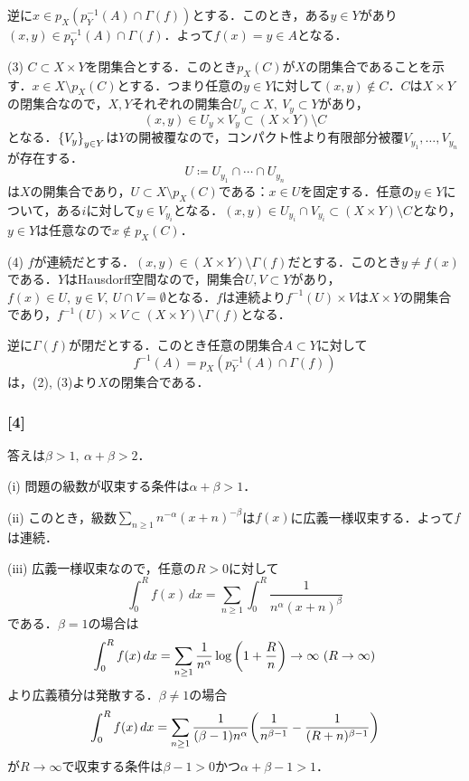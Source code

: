 \documentclass[a4j]{ltjsarticle}
\newcommand{\1}{\mathbbm{1}}
\numberwithin{equation}{section}
\theoremstyle{definition}
\begin{document}
逆に$x\in p_X(p_Y^{-1}(A)\cap \Gamma(f))$とする．このとき，ある$y\in Y$があり$(x,y)\in p_{Y}^{-1}(A)\cap \Gamma(f)$．よって$f(x)=y\in A$となる．

(3) $C\subset X\times Y$を閉集合とする．このとき$p_X(C)$が$X$の閉集合であることを示す．$x\in X\setminus p_X(C)$とする．つまり任意の$y\in Y$に対して$(x,y)\notin C$．$C$は$X\times Y$の閉集合なので，$X,Y$それぞれの開集合$U_y\subset X,\ V_y\subset Y$があり，
\begin{equation}
    (x,y)\in U_y\times V_y\subset (X\times Y)\setminus C 
\end{equation}
となる．$\qty{V_y}_{y\in Y}$は$Y$の開被覆なので，コンパクト性より有限部分被覆$V_{y_1},\ldots,V_{y_n}$が存在する．
\begin{equation}
    U\coloneq U_{y_1}\cap\cdots\cap U_{y_n} 
\end{equation}
は$X$の開集合であり，$U\subset X\setminus p_X(C)$である：$x\in U$を固定する．任意の$y\in Y$について，ある$i$に対して$y\in V_{y_i}$となる．$(x,y)\in U_{y_i}\cap V_{y_i}\subset (X\times Y)\setminus C$となり，$y\in Y$は任意なので$x\notin p_X(C)$．

(4) $f$が連続だとする．$(x,y)\in (X\times Y)\setminus \Gamma(f)$だとする．このとき$y\neq f(x)$である．$Y$はHausdorff空間なので，開集合$U,V\subset Y$があり，$f(x)\in U,\ y\in V,\ U\cap V=\emptyset$となる．$f$は連続より$f^{-1}(U)\times V$は$X\times Y$の開集合であり，$f^{-1}(U)\times V\subset (X\times Y)\setminus \Gamma(f)$となる．

逆に$\Gamma(f)$が閉だとする．このとき任意の閉集合$A\subset Y$に対して
\begin{equation}
    f^{-1}(A)=p_X(p_{Y}^{-1}(A)\cap \Gamma(f)) 
\end{equation}
は，(2), (3)より$X$の閉集合である．

\subsubsection*{[4]}
答えは$\beta>1,\ \alpha+\beta>2$．

(i) 問題の級数が収束する条件は$\alpha+\beta>1$．

(ii) このとき，級数$\sum_{n\geq 1}n^{-\alpha}(x+n)^{-\beta}$は$f(x)$に広義一様収束する．よって$f$は連続．

(iii) 広義一様収束なので，任意の$R>0$に対して
\begin{equation}
    \int_{0}^{R}f(x)\,dx=\sum_{n\geq 1}\int_{0}^{R}\frac{1}{n^{\alpha}(x+n)^{\beta}}
\end{equation}
である．$\beta=1$の場合は
\begin{equation}
    \int_{0}^{R}f(x)\,dx=\sum_{n\geq 1}\frac{1}{n^\alpha}\log\qty(1+\frac{R}{n})\to\infty\ (R\to\infty)
\end{equation}
より広義積分は発散する．$\beta\neq 1$の場合
\begin{equation}
    \int_{0}^{R}f(x)\,dx=\sum_{n\geq 1}\frac{1}{(\beta-1)n^{\alpha}}\qty(\frac{1}{n^{\beta-1}}-\frac{1}{(R+n)^{\beta-1}})
\end{equation}
が$R\to\infty$で収束する条件は$\beta-1>0$かつ$\alpha+\beta-1>1$．
\end{document}
